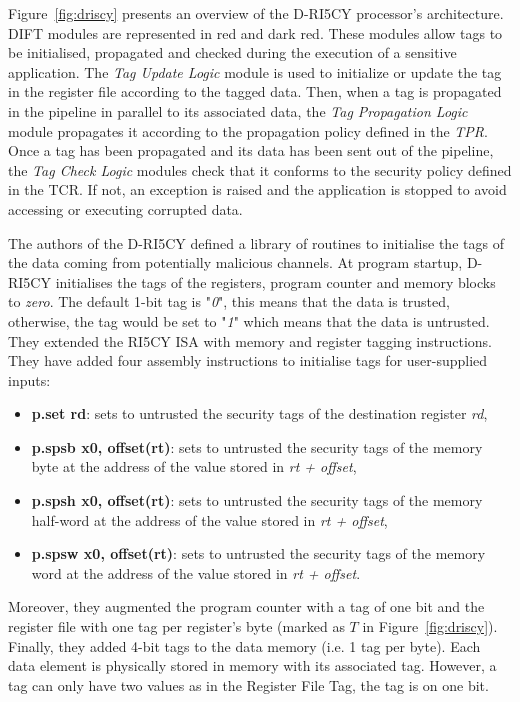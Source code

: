 Figure~\ref{fig:driscy} presents an overview of the D-RI5CY processor's architecture. DIFT modules are represented in red and dark red.
These modules allow tags to be initialised, propagated and checked during the execution of a sensitive application.
The \textit{Tag Update Logic} module is used to initialize or update the tag in the register file according to the tagged data.
Then, when a tag is propagated in the pipeline in parallel to its associated data, the \textit{Tag Propagation Logic} module propagates it according to the propagation policy defined in the \textit{TPR}.
Once a tag has been propagated and its data has been sent out of the pipeline, the \textit{Tag Check Logic} modules check that it conforms to the security policy defined in the TCR. If not, an exception is raised and the application is stopped to avoid accessing or executing corrupted data.

The authors of the D-RI5CY defined a library of routines to initialise the tags of the data coming from potentially malicious channels.
At program startup, D-RI5CY initialises the tags of the registers, program counter and memory blocks to \textit{zero}. The default 1-bit tag is "\textit{0}", this means that the data is trusted, otherwise, the tag would be set to "\textit{1}" which means that the data is untrusted.
They extended the RI5CY ISA with memory and register tagging instructions.
They have added four assembly instructions to initialise tags for user-supplied inputs:
\begin{itemize}
    \item \textbf{p.set rd}: sets to untrusted the security tags of the destination register \textit{rd},
    \item \textbf{p.spsb x0, offset(rt)}: sets to untrusted the security tags of the memory byte at the address of the value stored in \textit{rt + offset},
    \item \textbf{p.spsh x0, offset(rt)}: sets to untrusted the security tags of the memory half-word at the address of the value stored in \textit{rt + offset},
    \item \textbf{p.spsw x0, offset(rt)}: sets to untrusted the security tags of the memory word at the address of the value stored in \textit{rt + offset}.
\end{itemize}


Moreover, they augmented the program counter with a tag of one bit and the register file with one tag per register's byte (marked as $T$ in Figure~\ref{fig:driscy}). Finally, they added 4-bit tags to the data memory (i.e. 1 tag per byte).
Each data element is physically stored in memory with its associated tag. However, a tag can only have two values as in the Register File Tag, the tag is on one bit.

